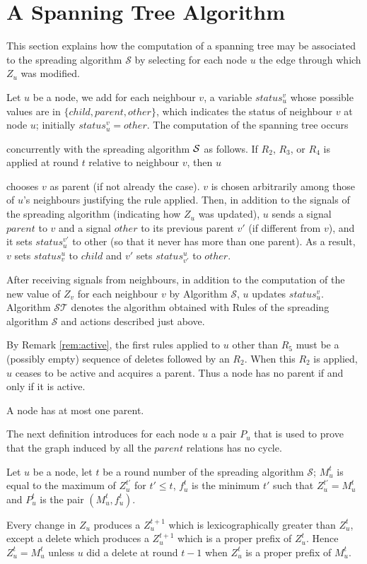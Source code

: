 \documentclass[11pt,envcountsame,letterpaper]{llncs}
\begin{document}
\section{A Spanning Tree Algorithm}
\label{sec:ST}
This section explains how the computation of a spanning tree may be associated 
to the spreading algorithm $\mathcal S$ by selecting for each node $u$
the edge through which $Z_u$ was modified.

Let $u$ be a node, we add for each neighbour $v$,  a variable 
$status_u^v$ whose possible values are in $\{child,parent,other\}$, which indicates the status of neighbour $v$ at node $u$; initially 
$status_u^v=other$.
The computation of the spanning tree occurs

concurrently with the spreading algorithm $\cal S$ as follows. If $R_2$, $R_3$, or $R_4$ is applied at round $t$ relative to neighbour $v$, then $u$

chooses $v$ as parent (if not already the case).
$v$ is chosen arbitrarily among those of $u$'s neighbours justifying the rule applied.
Then, in addition to the signals of the spreading algorithm (indicating how $Z_u$ was updated), $u$ sends a signal $parent$ to $v$ and a signal $other$ to its previous parent
$v'$
(if different from $v$), and it sets $status_u^{v'}$ to other (so that it never has more than one parent). As a result, $v$ sets $status_v^u$ to $child$
and $v'$ sets $status_{v'}^u$ to $other$.

After  receiving signals from neighbours,
in addition to the computation of the new value of $Z_v$ for each neighbour
$v$ by Algorithm 
$\mathcal S$, $u$ updates $status_u^v$.
Algorithm $\mathcal {ST}$ 
denotes the algorithm obtained with Rules of the spreading
algorithm $\mathcal S$ and actions described just above.


\begin{remark}\label{rem9}
By Remark \ref{rem:active}, the first rules applied to $u$ other than $R_5$ must be a
(possibly empty) sequence of deletes followed by an $R_2$. When this $R_2$ is applied,
$u$ ceases to be active and acquires a parent. Thus a
node has no parent if and only if it  is active.
\end{remark}
\begin{remark}\label{15}
A node has at most one parent.
\end{remark}



The next definition introduces for each node $u$ a
pair
$P_u$ that is
used to prove that the graph induced by all the $parent$ relations has no cycle.
\begin{definition}
Let $u$ be a node, let $t$ be a round number of the spreading
algorithm $\mathcal S$; $M_u^t$ is equal to the maximum of $Z_u^{t'}$ for $t'\le t$,
$f_u^t$ is the minimum $t'$ such that $Z_u^{t'}=M_u^t$ and $P_u^t$ is the pair
$(M_u^t,f_u^t)$.
\end{definition}
Every change in $Z_u$ produces a $Z_u^{t+1}$ which is lexicographically greater than $Z_u^t$, except a delete which produces a $Z_u^{t+1}$ which is a proper prefix of $Z_u^t$.
Hence $Z_u^t = M_u^t$ unless $u$ did a delete at round $t-1$ when $Z_u^t$ is a
proper prefix of $M_u^t$.
\end{document}
